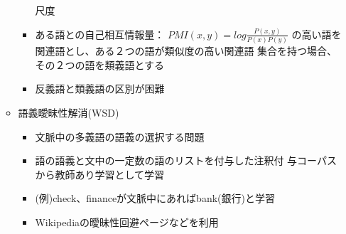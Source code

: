 \documentclass{jsarticle}
\begin{document}
\begin{itemize}
\begin{itemize}
\begin{itemize}
		     尺度
	       \item ある語との自己相互情報量：
		     $PMI(x,y) = log{\frac{P(x,y)}{P(x)P(y)}}$
		     の高い語を関連語とし、ある２つの語が類似度の高い関連語
		     集合を持つ場合、その２つの語を類義語とする
	       \item 反義語と類義語の区別が困難
	      \end{itemize}
	\item 語義曖昧性解消(WSD)
	      \begin{itemize}
	       \item 文脈中の多義語の語義の選択する問題
	       \item 語の語義と文中の一定数の語のリストを付与した注釈付
		     与コーパスから教師あり学習として学習
	       \item (例)check、financeが文脈中にあればbank(銀行)と学習
	       \item Wikipediaの曖昧性回避ページなどを利用
	      \end{itemize}
       \end{itemize}
\end{itemize}
\end{document}
